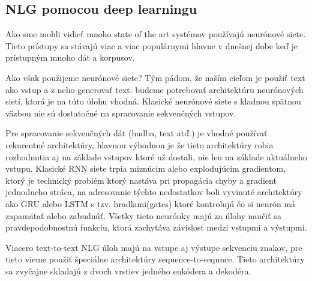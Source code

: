 \subsection{NLG pomocou deep learningu}
Ako sme mohli vidieť mnoho state of the art systémov používajú neurónové siete. Tieto prístupy sa stávajú viac a viac populárnymi hlavne v dnešnej dobe keď je prístupným mnoho dát a korpusov.

Ako však použijeme neurónové siete? Tým pádom, že naším cieľom je použiť text ako vstup a z neho generovať text. budeme potrebovať architektúru neurónových sietí, ktorá je na túto úlohu vhodná. Klasické neurónové siete s kladnou spätnou väzbou nie sú dostatočné na spracovanie sekvenčných vstupov.

Pre spracovanie sekvenčných dát (hudba, text atď.) je vhodné používať rekurentné architektúry, hlavnou výhodnou je že tieto architektúry robia rozhodnutia aj na základe vstupov ktoré už dostali, nie len na základe aktuálneho vstupu. Klasické RNN siete trpia miznúcim alebo explodujúcim gradientom\cite{pascanu_2013_difficulty}, ktorý je technický problém ktorý nastáva pri propagácia chyby a gradient jednoducho stráca, na adresovanie týchto nedostatkov boli vyvinuté architektúry ako GRU\cite{cho_2014_learning} alebo LSTM\cite{hochreiter_1997_long} s tzv. hradlami(gates) ktoré kontrolujú čo si neurón má zapamätať alebo zabudnúť. Všetky tieto neurónky majú za úlohy naučiť sa pravdepodobnostnú funkciu, ktorá zachytáva závislosť medzi vstupmi a výstupmi.

Viacero text-to-text NLG úloh majú na vstupe aj výstupe sekvenciu znakov, pre tieto vieme použiť špeciálne architektúry sequence-to-sequnce. Tieto architektúry sa zvyčajne skladajú z dvoch vrstiev jedného enkódera a dekodéra\cite{sutskever_2014_sequence}.